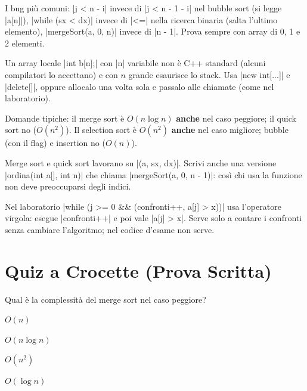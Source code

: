 \begin{trappola}
I bug più comuni: \cc|j < n - i| invece di \cc|j < n - 1 - i| nel bubble sort (si
legge \cc|a[n]|), \cc|while (sx < dx)| invece di \cc|<=| nella ricerca binaria (salta
l'ultimo elemento), \cc|mergeSort(a, 0, n)| invece di \cc|n - 1|. Prova sempre con
array di 0, 1 e 2 elementi.
\end{trappola}

\begin{trappola}
Un array locale \cc|int b[n];| con \cc|n| variabile non è C++ standard (alcuni
compilatori lo accettano) e con $n$ grande esaurisce lo stack. Usa \cc|new int[...]|
e \cc|delete[]|, oppure allocalo una volta sola e passalo alle chiamate (come nel
laboratorio).
\end{trappola}

\begin{trappola}
Domande tipiche: il merge sort è $O(n \log n)$ \textbf{anche} nel caso peggiore; il
quick sort no ($O(n^2)$). Il selection sort è $O(n^2)$ \textbf{anche} nel caso
migliore; bubble (con il flag) e insertion no ($O(n)$).
\end{trappola}

\begin{consiglio}
Merge sort e quick sort lavorano su \cc|(a, sx, dx)|. Scrivi anche una versione
\cc|ordina(int a[], int n)| che chiama \cc|mergeSort(a, 0, n - 1)|: così chi usa la
funzione non deve preoccuparsi degli indici.
\end{consiglio}

\begin{consiglio}
Nel laboratorio \cc|while (j >= 0 && (confronti++, a[j] > x))| usa l'operatore
virgola: esegue \cc|confronti++| e poi vale \cc|a[j] > x|. Serve solo a contare i
confronti senza cambiare l'algoritmo; nel codice d'esame non serve.
\end{consiglio}

\section{Quiz a Crocette (Prova Scritta)}

\begin{quiz}{Qual è la complessità del merge sort nel caso peggiore?}
  \item $O(n)$
  \item $O(n \log n)$
  \item $O(n^2)$
  \item $O(\log n)$
\end{quiz}

